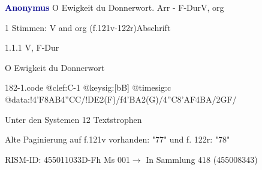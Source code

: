 \documentclass[twocolumn, 12pt]{book}
\begin{document}
\par \vspace{16pt} \textcolor{darkblue}{\textbf{Anonymus  }}\hfillplus{\textbf{[182]}}\newline O Ewigkeit du Donnerwort. Arr - F-Dur\newline V, org
\par \begin{itshape}\end{itshape} 
\par \textcolor{darkblue}{}  1 Stimmen: V and org  (f.121v-122r)\newline Abschrift
\par 1.1.1  V, F-Dur\newline \begin{footnotesize} O Ewigkeit du Donnerwort \end{footnotesize}  
\begin{filecontents*}{182-1.code}
@clef:C-1
@keysig:[bB]
@timesig:c
@data:!4'F8AB4''CC/!DE2(F)/f4'BA2(G)/4''C8'AF4BA/2GF/
\end{filecontents*}
\newline %
\par Unter den Systemen 12 Textstrophen
\par Alte Paginierung auf f.121v vorhanden: "77" und f. 122r: "78"
\par RISM-ID: 455011033\newline D-Fh  Ms 001\newline $\rightarrow$ In Sammlung 418 (455008343)
      
\end{document}
